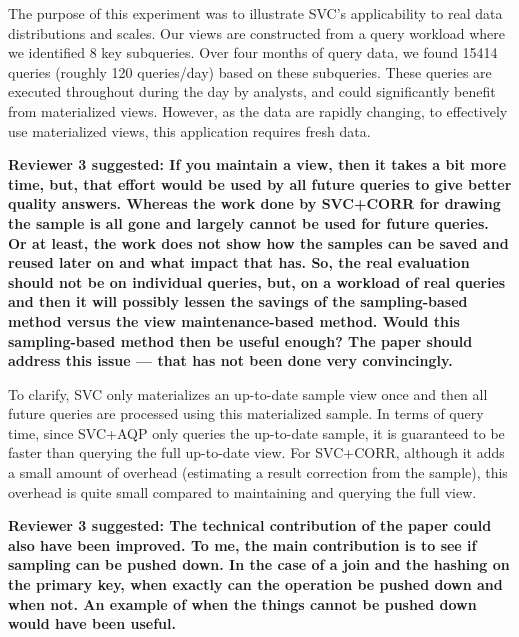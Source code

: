 The purpose of this experiment was to illustrate SVC's applicability to real data distributions and scales. 
Our views are constructed from a query workload where we identified 8 key subqueries.
Over four months of query data, we found 15414 queries (roughly 120 queries/day) based on these subqueries.
These queries are executed throughout during the day by analysts, and could significantly benefit from materialized views. 
However, as the data are rapidly changing, to effectively use materialized views, this application requires fresh data.

\vspace{1.5em}

\textbf{Reviewer 3 suggested:  If you maintain a view, then it takes a bit more time, but, that effort would be used by all future queries to give better quality answers. Whereas the work done by SVC+CORR for drawing the sample is all gone and largely cannot be used for future queries. Or at least, the work does not show how the samples can be saved and reused later on and what impact that has. So, the real evaluation should not be on individual queries, but, on a workload of real queries and then it will possibly lessen the savings of the sampling-based method versus the view maintenance-based method. Would this sampling-based method then be useful enough? The paper should address this issue --- that has not been done very convincingly.}

To clarify, SVC only materializes an up-to-date sample view once and then all future queries are processed using this materialized sample. In terms of query time, since SVC+AQP only queries the up-to-date sample, it is guaranteed to be faster than querying the full up-to-date view. For SVC+CORR, although it adds a small amount of overhead (estimating a result correction from the sample), this overhead is quite small compared to maintaining and querying the full view. 

\vspace{1.5em}

\textbf{Reviewer 3 suggested: The technical contribution of the paper could also have been improved. To me, the main contribution is to see if sampling can be pushed down. In the case of a join and the hashing on the primary key, when exactly can the operation be pushed down and when not. An example of when the things cannot be pushed down would have been useful. }


